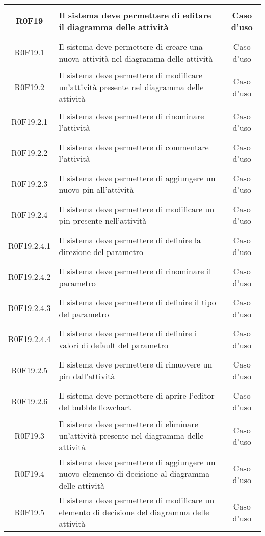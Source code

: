 \documentclass[../AnalisiDeiRequisiti.tex]{subfiles}
\begin{document}
\begin{longtable}{|c|>{\centering}p{7cm}|c|}
	\hypertarget{R0F19}{R0F19} & Il sistema deve permettere di editare il diagramma delle attività & Caso d'uso \\ \hline
	\hypertarget{R0F19.1}{R0F19.1} & Il sistema deve permettere di creare una nuova attività nel diagramma delle attività & Caso d'uso \\ \hline
	\hypertarget{R0F19.2}{R0F19.2} & Il sistema deve permettere di modificare un'attività presente nel diagramma delle attività & Caso d'uso \\ \hline
	\hypertarget{R0F19.2.1}{R0F19.2.1} & Il sistema deve permettere di rinominare l'attività & Caso d'uso \\ \hline
	\hypertarget{R0F19.2.2}{R0F19.2.2} & Il sistema deve permettere di commentare l'attività & Caso d'uso \\ \hline
	\hypertarget{R0F19.2.3}{R0F19.2.3} & Il sistema deve permettere di aggiungere un nuovo pin all'attività & Caso d'uso \\ \hline
	\hypertarget{R0F19.2.4}{R0F19.2.4} & Il sistema deve permettere di modificare un pin presente nell'attività & Caso d'uso \\ \hline
	\hypertarget{R0F19.2.4.1}{R0F19.2.4.1} & Il sistema deve permettere di definire la direzione del parametro & Caso d'uso \\ \hline
	\hypertarget{R0F19.2.4.2}{R0F19.2.4.2} & Il sistema deve permettere di rinominare il parametro & Caso d'uso \\ \hline
	\hypertarget{R0F19.2.4.3}{R0F19.2.4.3} & Il sistema deve permettere di definire il tipo del parametro & Caso d'uso \\ \hline
	\hypertarget{R0F19.2.4.4}{R0F19.2.4.4} & Il sistema deve permettere di definire i valori di default del parametro & Caso d'uso \\ \hline
	\hypertarget{R0F19.2.5}{R0F19.2.5} & Il sistema deve permettere di rimuovere un pin dall'attività & Caso d'uso \\ \hline
	\hypertarget{R0F19.2.6}{R0F19.2.6} & Il sistema deve permettere di aprire l'editor del bubble flowchart & Caso d'uso \\ \hline
	\hypertarget{R0F19.3}{R0F19.3} & Il sistema deve permettere di eliminare un'attività presente nel diagramma delle attività & Caso d'uso \\ \hline
	\hypertarget{R0F19.4}{R0F19.4} & Il sistema deve permettere di aggiungere un nuovo elemento di decisione al diagramma delle attività & Caso d'uso \\ \hline
	\hypertarget{R0F19.5}{R0F19.5} & Il sistema deve permettere di modificare un elemento di decisione del diagramma delle attività & Caso d'uso \\ \hline

\end{longtable}
\end{document}
